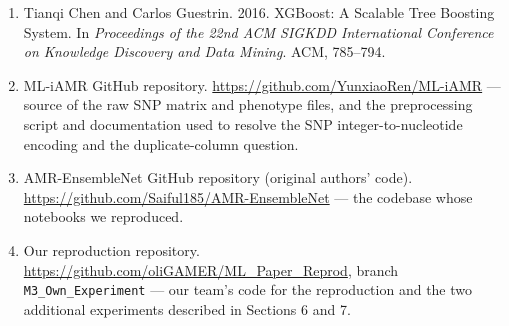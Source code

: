 \documentclass[11pt]{article}
\begin{document}
\begin{enumerate}[leftmargin=2.2em, itemsep=0.4em]
\item Tianqi Chen and Carlos Guestrin. 2016. XGBoost: A Scalable Tree Boosting System. In \textit{Proceedings of the 22nd ACM SIGKDD International Conference on Knowledge Discovery and Data Mining}. ACM, 785--794.

\item ML-iAMR GitHub repository. \url{https://github.com/YunxiaoRen/ML-iAMR} --- source of the raw SNP matrix and phenotype files, and the preprocessing script and documentation used to resolve the SNP integer-to-nucleotide encoding and the duplicate-column question.

\item AMR-EnsembleNet GitHub repository (original authors' code). \url{https://github.com/Saiful185/AMR-EnsembleNet} --- the codebase whose notebooks we reproduced.

\item Our reproduction repository. \url{https://github.com/oliGAMER/ML_Paper_Reprod}, branch \texttt{M3\_Own\_Experiment} --- our team's code for the reproduction and the two additional experiments described in Sections 6 and 7.

\end{enumerate}
\end{document}
